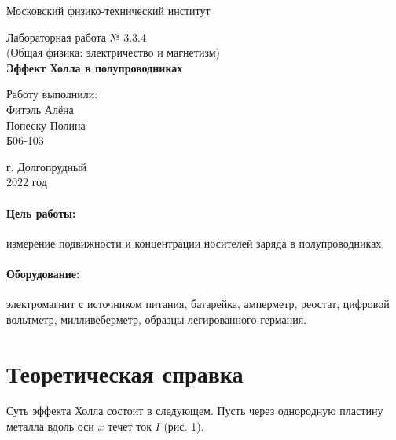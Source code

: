 \documentclass[12pt,a4paper]{article}
\begin{document}
	
	\begin{titlepage}
		\begin{center}
			\large 	Московский физико-технический институт \\
			\vspace{0.2cm}
			
			\vspace{4.5cm}
			Лабораторная работа № 3.3.4 \\ \vspace{0.2cm}
			\large (Общая физика: электричество и магнетизм) \\ \vspace{0.2cm}
			\LARGE \textbf{Эффект Холла в полупроводниках}
		\end{center}
		\vspace{2.3cm} \large
		
		\begin{center}
			Работу выполнили: \\
			Фитэль Алёна\\
                Попеску Полина\\
                Б06-103
			\vspace{10mm}		
			
		\end{center}
		
		\begin{center} \vspace{60mm}
			г. Долгопрудный \\
			2022 год
		\end{center}
	\end{titlepage}
	
	
	\paragraph*{Цель работы:} измерение подвижности и концентрации носителей заряда в полупроводниках.
	
	\paragraph*{Оборудование:} электромагнит с источником питания, батарейка, амперметр, реостат, цифровой вольтметр, милливеберметр, образцы легированного германия.
	
	\section{Теоретическая справка}
	Суть эффекта Холла состоит в следующем. Пусть через однородную пластину металла вдоль оси $x$ течет ток $I$ (рис. 1).
	
\end{document}
